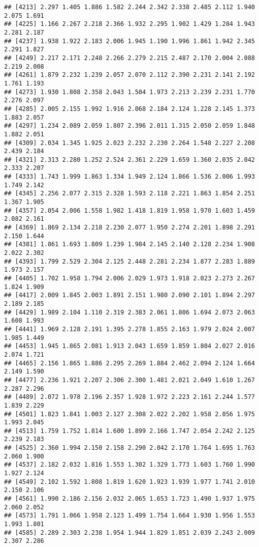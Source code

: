 \documentclass[
]{article}
\begin{document}
\begin{verbatim}
## [4213] 2.297 1.405 1.886 1.582 2.244 2.342 2.338 2.485 2.112 1.940 2.075 1.691
## [4225] 1.166 2.267 2.218 2.366 1.932 2.295 1.902 1.429 1.284 1.943 2.281 2.187
## [4237] 1.938 1.922 2.183 2.006 1.945 1.190 1.996 1.861 1.942 2.345 2.291 1.827
## [4249] 2.217 2.171 2.248 2.266 2.279 2.215 2.487 2.170 2.004 2.088 2.219 2.008
## [4261] 1.879 2.232 1.239 2.057 2.070 2.112 2.390 2.231 2.141 2.192 1.761 1.193
## [4273] 1.930 1.808 2.358 2.043 1.504 1.973 2.213 2.239 2.231 1.770 2.276 2.097
## [4285] 2.005 2.155 1.992 1.916 2.068 2.184 2.124 1.228 2.145 1.373 1.883 2.057
## [4297] 1.234 2.089 2.059 1.807 2.396 2.011 1.315 2.050 2.059 1.848 1.882 2.051
## [4309] 2.034 1.345 1.925 2.023 2.232 2.230 2.264 1.548 2.227 2.208 2.439 2.184
## [4321] 2.313 2.280 1.252 2.524 2.361 2.229 1.659 1.360 2.035 2.042 2.333 2.207
## [4333] 1.743 1.999 1.863 1.334 1.949 2.124 1.866 1.536 2.006 1.993 1.749 2.142
## [4345] 2.256 2.077 2.315 2.328 1.593 2.118 2.221 1.863 1.854 2.251 1.367 1.905
## [4357] 2.054 2.006 1.558 1.982 1.418 1.819 1.958 1.970 1.603 1.459 2.082 2.161
## [4369] 1.869 2.134 2.218 2.230 2.077 1.950 2.274 2.201 1.898 2.291 2.150 1.644
## [4381] 1.861 1.693 1.809 1.239 1.984 2.145 2.140 2.128 2.234 1.908 2.022 2.302
## [4393] 1.799 2.529 2.304 2.125 2.448 2.281 2.234 1.877 2.283 1.889 1.973 2.157
## [4405] 1.702 1.958 1.794 2.006 2.029 1.973 1.918 2.023 2.273 2.267 1.824 1.909
## [4417] 2.009 1.845 2.003 1.891 2.151 1.980 2.090 2.101 1.894 2.297 2.189 2.185
## [4429] 1.989 2.104 1.110 2.319 2.383 2.061 1.806 1.694 2.073 2.063 1.608 1.993
## [4441] 1.969 2.128 2.191 1.395 2.278 1.855 2.163 1.979 2.024 2.007 1.985 1.449
## [4453] 1.945 1.865 2.081 1.913 2.043 1.659 1.859 1.804 2.027 2.016 2.074 1.721
## [4465] 2.156 1.865 1.886 2.295 2.269 1.884 2.462 2.094 2.124 1.664 2.149 1.590
## [4477] 2.236 1.921 2.207 2.306 2.300 1.481 2.021 2.049 1.610 1.267 2.287 2.296
## [4489] 2.072 1.978 2.196 2.357 1.928 1.972 2.223 2.161 2.244 1.577 1.839 2.229
## [4501] 1.823 1.841 1.003 2.127 2.308 2.022 2.202 1.958 2.056 1.975 1.993 2.045
## [4513] 1.759 1.752 1.814 1.600 1.899 2.166 1.747 2.054 2.242 2.125 2.239 2.183
## [4525] 2.360 1.994 2.150 2.158 2.290 2.042 2.170 1.764 1.695 1.763 2.060 1.900
## [4537] 2.182 2.032 1.816 1.553 1.302 1.329 1.773 1.603 1.760 1.990 1.927 2.124
## [4549] 2.102 1.592 1.808 1.819 1.620 1.923 1.939 1.977 1.741 2.010 2.150 2.106
## [4561] 1.990 2.186 2.156 2.032 2.065 1.653 1.723 1.490 1.937 1.975 2.060 2.052
## [4573] 1.791 1.066 1.958 2.123 1.499 1.754 1.664 1.930 1.956 1.553 1.993 1.801
## [4585] 2.289 2.303 2.238 1.954 1.944 1.829 1.851 2.039 2.243 2.009 2.307 2.286

\end{verbatim}
\end{document}
